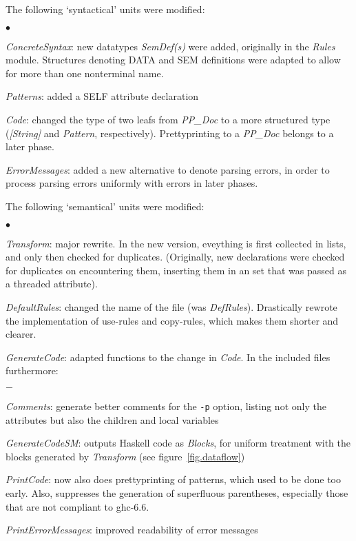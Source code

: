 \documentclass[twoside]{article}
\newenvironment{itize}{\begin{list}{$\bullet$}{\parsep=0pt\parskip=0pt\topsep=0pt\itemsep=0pt}}{\end{list}}
\newenvironment{subitize}{\begin{list}{$-$}{\parsep=0pt\parskip=0pt\topsep=0pt\itemsep=0pt}}{\end{list}}
\begin{document}
The following `syntactical' units were modified:
\begin{itize}
\item {\em ConcreteSyntax}:
      new datatypes {\em SemDef(s)} were added, originally in the {\em Rules} module.
      Structures denoting DATA and SEM definitions were adapted to allow for more than one nonterminal name.
\item {\em Patterns}:
      added a SELF attribute declaration
\item {\em Code}:
      changed the type of two leafs from {\em PP\_Doc} to a more structured type
      ({\em [String]} and {\em Pattern}, respectively).
      Prettyprinting to a {\em PP\_Doc} belongs to a later phase.
\item {\em ErrorMessages}:
      added a new alternative to denote parsing errors,
      in order to process parsing errors uniformly with errors in later phases.
\end{itize}

The following `semantical' units were modified:
\begin{itize}
\item {\em Transform}:
      major rewrite.
      In the new version, eveything is first collected in lists, and only then checked for duplicates.
      (Originally, new declarations were checked for duplicates on encountering them, inserting them
      in an set that was passed as a threaded attribute).
\item {\em DefaultRules}:
      changed the name of the file (was {\em DefRules}).
      Drastically rewrote the implementation of use-rules and copy-rules,
      which makes them shorter and clearer.
\item {\em GenerateCode}:
      adapted functions to the change in {\em Code}.
      In the included files furthermore:
      \begin{subitize}
      \item {\em Comments}: 
            generate better comments for the \verb"-p" option,
            listing not only the attributes but also the children and local variables
      \item {\em GenerateCodeSM}:
            outputs Haskell code as {\em Blocks}, for uniform treatment with the blocks
            generated by {\em Transform} (see figure~\ref{fig.dataflow})
      \end{subitize}
\item {\em PrintCode}:
      now also does prettyprinting of patterns, which used to be done too early.
      Also, suppresses the generation of superfluous parentheses,
      especially those that are not compliant to ghc-6.6.
\item {\em PrintErrorMessages}:
      improved readability of error messages
\end{itize}
\end{document}
